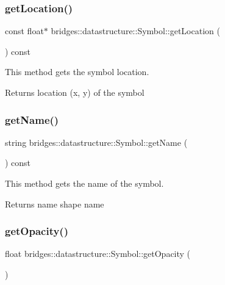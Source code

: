 \subsubsection{\texorpdfstring{get\+Location()}{getLocation()}}
{\footnotesize\ttfamily const float$\ast$ bridges\+::datastructure\+::\+Symbol\+::get\+Location (\begin{DoxyParamCaption}{ }\end{DoxyParamCaption}) const\hspace{0.3cm}{\ttfamily [inline]}}



This method gets the symbol location. 

\begin{DoxyReturn}{Returns}
location (x, y) of the symbol 
\end{DoxyReturn}
\mbox{\label{classbridges_1_1datastructure_1_1_symbol_a9365f8d91faf67e14ceaa89f8a5d0338}} 
\subsubsection{\texorpdfstring{get\+Name()}{getName()}}
{\footnotesize\ttfamily string bridges\+::datastructure\+::\+Symbol\+::get\+Name (\begin{DoxyParamCaption}{ }\end{DoxyParamCaption}) const\hspace{0.3cm}{\ttfamily [inline]}}



This method gets the name of the symbol. 

\begin{DoxyReturn}{Returns}
name shape name 
\end{DoxyReturn}
\mbox{\label{classbridges_1_1datastructure_1_1_symbol_af77f6e4c42ca97672888d863335b851a}} 
\subsubsection{\texorpdfstring{get\+Opacity()}{getOpacity()}}
{\footnotesize\ttfamily float bridges\+::datastructure\+::\+Symbol\+::get\+Opacity (\begin{DoxyParamCaption}{ }\end{DoxyParamCaption})\hspace{0.3cm}{\ttfamily [inline]}}




